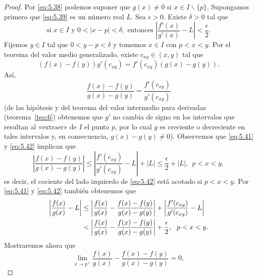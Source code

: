 \documentclass[12pt,a4paper]{book}
\begin{document}
    \begin{proof}
        Por \eqref{eq:5.38} podemos suponer que $g(x)\neq 0$ si $x\in I\backslash\{p\}$.
        Supongamos primero que \eqref{eq:5.39} es un número real $L$. Sea $\epsilon>0$. Existe $\delta>0$
        tal que
        \begin{equation}\label{eq:5.41}
            \text{si }x\in I\text{ y }0<|x-p|<\delta,\text{ entonces }\left|\frac{f'(x)}{g'(x)}-L\right|<\frac{\epsilon}{2}.
        \end{equation}
        Fijemos $y\in I$ tal que $0<y-p<\delta$ y tomemos $x\in I$ con $p<x<y$. Por el
        teorema del valor medio generalizado, existe $c_{xy}\in(x,y)$ tal que
        \begin{equation*}
            (f(x)-f(y))g'(c_{xy})=f'(c_{xy})(g(x)-g(y)).
        \end{equation*}
        Así,
        \begin{equation}\label{eq:5.42}
            \frac{f(x)-f(y)}{g(x)-g(y)}=\frac{f'(c_{xy})}{g'(c_{xy})}
        \end{equation}
        (de las hipótesis y del teorema del valor intermedio para derivadas (teorema~\ref{teo:6})
        obtenemos que $g'$ no cambia de signo en los intervalos que resultan al
        «extraer» de $I$ el punto $p$, por lo cual $g$ es creciente o decreciente en tales
        intervalos y, en consecuencia, $g(x)-g(y)\neq 0$). Observemos que \eqref{eq:5.41} y
        \eqref{eq:5.42} implican que
        \begin{equation*}
            \left|\frac{f(x)-f(y)}{g(x)-g(y)}\right|\leq\left|\frac{f'(c_{xy})}{g'(c_{xy})}-L\right|+|L|\leq\frac{\epsilon}{2}+|L|,\ \ p<x<y,
        \end{equation*}
        es decir, el cociente del lado izquierdo de \eqref{eq:5.42} está acotado si $p<x<y$.
        Por \eqref{eq:5.41} y \eqref{eq:5.42} también obtenemos que
        \begin{align}
            \left|\frac{f(x)}{g(x)}-L\right|&\leq\left|\frac{f(x)}{g(x)}-\frac{f(x)-f(y)}{g(x)-g(y)}\right|+\left|\frac{f'(c_{xy})}{g'(c_{xy})}-L\right|\notag\\
            &<\left|\frac{f(x)}{g(x)}-\frac{f(x)-f(y)}{g(x)-g(y)}\right|+\frac{\epsilon}{2},\ \ p<x<y.\label{eq:5.43}
        \end{align}
        Mostraremos ahora que
        \begin{equation}\label{eq:5.44}
            \lim_{x\to p^{+}}\frac{f(x)}{g(x)}-\frac{f(x)-f(y)}{g(x)-g(y)}=0,
        \end{equation}

\end{proof}
\end{document}
